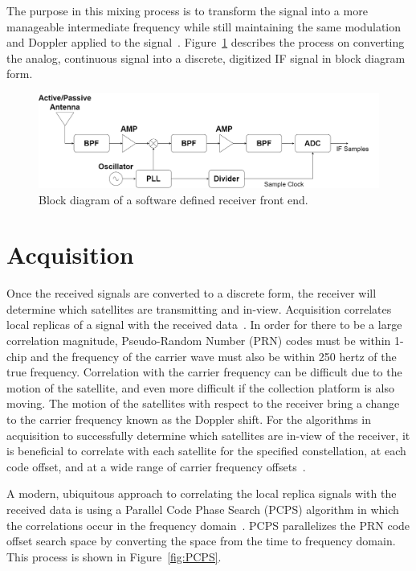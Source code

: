 The purpose in this mixing process is to transform the signal into a more manageable intermediate frequency while still maintaining the same modulation and Doppler applied to the signal~\cite{bradfordparkinsonGlobalPositioningSystem1996}. Figure~\ref{fig:frontend} describes the process on converting the analog, continuous signal into a discrete, digitized IF signal in block diagram form.

\begin{figure}[!ht]\label{fig:frontend}
    \centering
    \includegraphics[width=\linewidth]{Figures/frontend.drawio.png}
    \caption{Block diagram of a software defined receiver front end.}
\end{figure}

\section{\textbf{Acquisition}}
Once the received signals are converted to a discrete form, the receiver will determine which satellites are transmitting and in-view. Acquisition correlates local replicas of a signal with the received data~\cite{akosEffectSamplingFrequency2006}. In order for there to be a large correlation magnitude, Pseudo-Random Number (PRN) codes must be within 1-chip and the frequency of the carrier wave must also be within 250 hertz of the true frequency. Correlation with the carrier frequency can be difficult due to the motion of the satellite, and even more difficult if the collection platform is also moving. The motion of the satellites with respect to the receiver bring a change to the carrier frequency known as the Doppler shift. For the algorithms in acquisition to successfully determine which satellites are in-view of the receiver, it is beneficial to correlate with each satellite for the specified constellation, at each code offset, and at a wide range of carrier frequency offsets~\cite{kaplanUnderstandingGPSPrinciples2006}.

A modern, ubiquitous approach to correlating the local replica signals with the received data is using a Parallel Code Phase Search (PCPS) algorithm in which the correlations occur in the frequency domain~\cite{scottRapidSignalAcquisition2001}. PCPS parallelizes the PRN code offset search space by converting the space from the time to frequency domain. This process is shown in Figure~\ref{fig:PCPS}.

